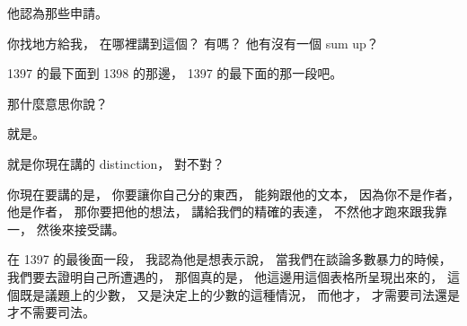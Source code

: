 \hypertarget{w06:cue:3098}{}他認為那些申請。

\hypertarget{w06:cue:3099}{}你找地方給我，
\hypertarget{w06:cue:3100}{}在哪裡講到這個？
\hypertarget{w06:cue:3101}{}有嗎？
\hypertarget{w06:cue:3102}{}他有沒有一個 sum up？

\hypertarget{w06:cue:3103}{}1397 的最下面到 1398 的那邊，
\hypertarget{w06:cue:3104}{}1397 的最下面的那一段吧。

\hypertarget{w06:cue:3105}{}那什麼意思你說？

\hypertarget{w06:cue:3106}{}就是。

\hypertarget{w06:cue:3107}{}就是你現在講的 distinction，
\hypertarget{w06:cue:3108}{}對不對？

\hypertarget{w06:cue:3109}{}你現在要講的是，
\hypertarget{w06:cue:3110}{}你要讓你自己分的東西，
\hypertarget{w06:cue:3111}{}能夠跟他的文本，
\hypertarget{w06:cue:3112}{}因為你不是作者，
\hypertarget{w06:cue:3113}{}他是作者，
\hypertarget{w06:cue:3114}{}那你要把他的想法，
\hypertarget{w06:cue:3115}{}講給我們的精確的表達，
\hypertarget{w06:cue:3116}{}不然他才跑來跟我靠一，
\hypertarget{w06:cue:3117}{}然後來接受講。

\hypertarget{w06:cue:3118}{}在 1397 的最後面一段，
\hypertarget{w06:cue:3119}{}我認為他是想表示說，
\hypertarget{w06:cue:3120}{}當我們在談論多數暴力的時候，
\hypertarget{w06:cue:3121}{}我們要去證明自己所遭遇的，
\hypertarget{w06:cue:3122}{}那個真的是，
\hypertarget{w06:cue:3123}{}他這邊用這個表格所呈現出來的，
\hypertarget{w06:cue:3124}{}這個既是議題上的少數，
\hypertarget{w06:cue:3125}{}又是決定上的少數的這種情況，
\hypertarget{w06:cue:3126}{}而他才，
\hypertarget{w06:cue:3127}{}才需要司法還是才不需要司法。

